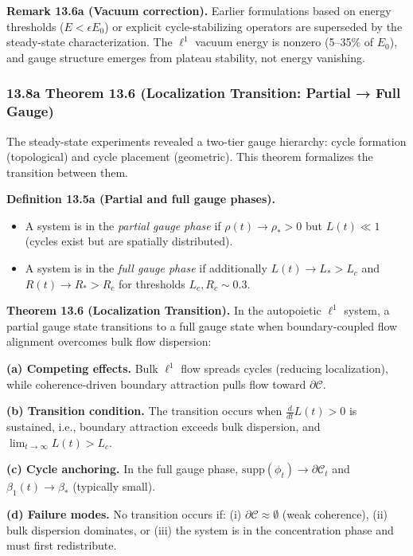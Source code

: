 \documentclass[
]{article}
\providecommand{\tightlist}{%
  \setlength{\itemsep}{0pt}\setlength{\parskip}{0pt}}
\begin{document}
\textbf{Remark 13.6a (Vacuum correction).} Earlier formulations based on
energy thresholds (\(E < \epsilon E_0\)) or explicit cycle-stabilizing
operators are superseded by the steady-state characterization. The
\(\ell^1\) vacuum energy is nonzero (5--35\% of \(E_0\)), and gauge
structure emerges from plateau stability, not energy vanishing.

\subsubsection{13.8a Theorem 13.6 (Localization Transition: Partial →
Full
Gauge)}\label{a-theorem-13.6-localization-transition-partial-full-gauge}

The steady-state experiments revealed a two-tier gauge hierarchy: cycle
formation (topological) and cycle placement (geometric). This theorem
formalizes the transition between them.

\textbf{Definition 13.5a (Partial and full gauge phases).}

\begin{itemize}
\tightlist
\item
  A system is in the \emph{partial gauge phase} if
  \(\rho(t) \to \rho_* > 0\) but \(L(t) \ll 1\) (cycles exist but are
  spatially distributed).
\item
  A system is in the \emph{full gauge phase} if additionally
  \(L(t) \to L_* > L_c\) and \(R(t) \to R_* > R_c\) for thresholds
  \(L_c, R_c \sim 0.3\).
\end{itemize}

\textbf{Theorem 13.6 (Localization Transition).} In the autopoietic
\(\ell^1\) system, a partial gauge state transitions to a full gauge
state when boundary-coupled flow alignment overcomes bulk flow
dispersion:

\textbf{(a) Competing effects.} Bulk \(\ell^1\) flow spreads cycles
(reducing localization), while coherence-driven boundary attraction
pulls flow toward \(\partial\mathcal{C}\).

\textbf{(b) Transition condition.} The transition occurs when
\(\frac{d}{dt} L(t) > 0\) is sustained, i.e., boundary attraction
exceeds bulk dispersion, and \(\lim_{t \to \infty} L(t) > L_c\).

\textbf{(c) Cycle anchoring.} In the full gauge phase,
\(\mathrm{supp}(\phi_t) \to \partial\mathcal{C}_t\) and
\(\beta_1(t) \to \beta_*\) (typically small).

\textbf{(d) Failure modes.} No transition occurs if: (i)
\(\partial\mathcal{C} \approx \emptyset\) (weak coherence), (ii) bulk
dispersion dominates, or (iii) the system is in the concentration phase
and must first redistribute.
\end{document}
